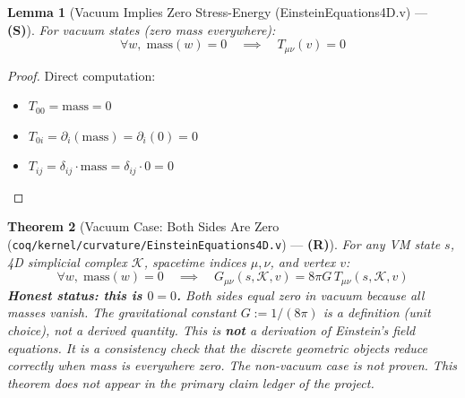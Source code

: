 \documentclass[11pt, a4paper]{report}
\theoremstyle{definition}
\theoremstyle{plain}
\newtheorem{theorem}{Theorem}[chapter]
\newtheorem{lemma}[theorem]{Lemma}
\begin{document}
\begin{lemma}[Vacuum Implies Zero Stress-Energy {\normalfont (EinsteinEquations4D.v)} --- \textbf{(S)}]
\label{lem:stress_conservation}
For vacuum states (zero mass everywhere):
\begin{equation}
\forall w,\; \text{mass}(w) = 0 \quad \implies \quad T_{\mu\nu}(v) = 0
\end{equation}
\end{lemma}

\begin{proof}
Direct computation:
\begin{itemize}
    \item $T_{00} = \text{mass} = 0$
    \item $T_{0i} = \partial_i(\text{mass}) = \partial_i(0) = 0$
    \item $T_{ij} = \delta_{ij} \cdot \text{mass} = \delta_{ij} \cdot 0 = 0$
\end{itemize}
\end{proof}

\begin{theorem}[Vacuum Case: Both Sides Are Zero {\normalfont (\texttt{coq/kernel/curvature/EinsteinEquations4D.v})} --- \textbf{(R)}]
\label{thm:einstein_main}
For any VM state $s$, 4D simplicial complex $\mathcal{K}$, spacetime indices $\mu, \nu$, and vertex $v$:
\begin{equation}
\forall w,\; \text{mass}(w) = 0 \quad \implies \quad G_{\mu\nu}(s,\mathcal{K},v) = 8\pi G \, T_{\mu\nu}(s,\mathcal{K},v)
\end{equation}
\textbf{Honest status: this is $0 = 0$.} Both sides equal zero in vacuum because all masses vanish. The gravitational constant $G := 1/(8\pi)$ is a definition (unit choice), not a derived quantity. This is \textbf{not} a derivation of Einstein's field equations. It is a consistency check that the discrete geometric objects reduce correctly when mass is everywhere zero. The non-vacuum case is not proven. This theorem does not appear in the primary claim ledger of the project.
\end{theorem}
\end{document}
